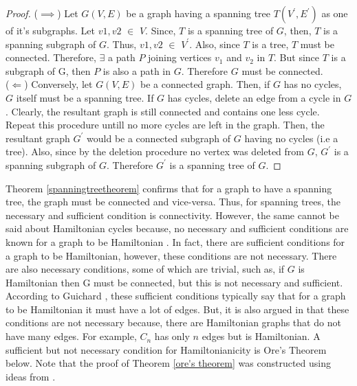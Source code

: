 \documentclass[12pt]{article}
\numberwithin{equation}{subsection}
\numberwithin{table}{subsection}
\numberwithin{algorithm}{subsection}
\begin{document}
\begin{proof}
($\implies$) Let $\mathit{G(V,E)}$ be a graph having a spanning tree $\mathit{T(V^\prime,E^\prime)}$ as one of it's subgraphs. Let $\mathit{v1, v2}$ $\in$ $\mathit{V}$. Since, $\mathit{T}$ is a spanning tree of $\mathit{G}$, then, $\mathit{T}$ is a spanning subgraph of $\mathit{G}$. Thus, $\mathit{v1, v2}$ $\in$ $V^\prime$. Also, since $\mathit{T}$ is a tree, $\mathit{T}$ must be connected. Therefore, $\exists$ a path $\mathit{P}$ joining vertices $\mathit{v_1}$ and $\mathit{v_2}$ in $\mathit{T}$. But since $\mathit{T}$ is a subgraph of G, then $\mathit{P}$ is also a path in $\mathit{G}$. Therefore $\mathit{G}$ must be connected.\\
($\Leftarrow$) Conversely, let $\mathit{G(V,E)}$ be a connected graph. Then, if $\mathit{G}$ has no cycles, $\mathit{G}$ itself must be a spanning tree. If $\mathit{G}$ has cycles, delete an edge from a cycle in $\mathit{G}$. Clearly, the resultant graph is still connected and contains one less cycle. Repeat this procedure untill no more cycles are left in the graph. Then, the resultant graph $\mathit{G^\prime}$ would be a connected subgraph of $\mathit{G}$ having no cycles (i.e a tree). Also, since by the deletion procedure no vertex was deleted from $\mathit{G}$, $\mathit{G^\prime}$ is a spanning subgraph of $\mathit{G}$. Therefore $\mathit{G^\prime}$ is a spanning tree of $\mathit{G}$.
\end{proof}
Theorem \ref{spanningtreetheorem} confirms that for a graph to have a spanning tree, the graph must be connected and vice-versa. Thus, for spanning trees, the necessary and sufficient condition is connectivity. However, the same cannot be said about Hamiltonian cycles because, no necessary and sufficient conditions are known for a graph to be Hamiltonian \cite{guichard_2018}. In fact, there are sufficient conditions for a graph to be Hamiltonian, however, these conditions are not necessary. There are also necessary conditions, some of which are trivial, such as, if $\mathit{G}$ is Hamiltonian then G must be connected, but this is not necessary and sufficient. According to Guichard \cite{guichard_2018}, these sufficient conditions typically say that for a graph to be Hamiltonian it must have a lot of edges. But, it is also argued in \cite{guichard_2018} that these conditions are not necessary because, there are Hamiltonian graphs that do not have many edges. For example, $\mathit{C_n}$ has only $\mathit{n}$ edges but is Hamiltonian. A sufficient but not necessary condition for Hamiltonianicity is Ore's Theorem below. Note that the proof of Theorem \ref{ore's theorem} was constructed using ideas from {}.
\end{document}
